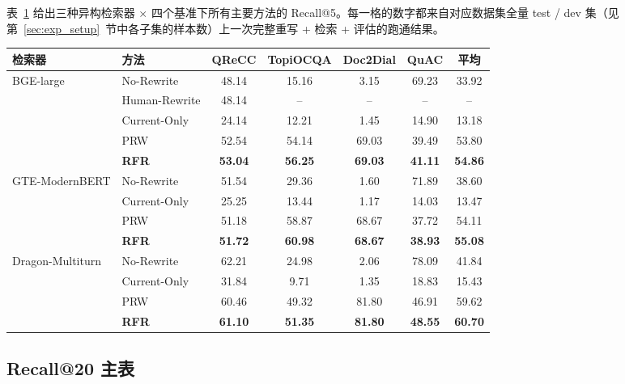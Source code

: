 表~\ref{tab:main_r5} 给出三种异构检索器 $\times$ 四个基准下所有主要方法的 Recall@5。每一格的数字都来自对应数据集全量 test / dev 集（见第~\ref{sec:exp_setup}~节中各子集的样本数）上一次完整重写 + 检索 + 评估的跑通结果。

\begin{table}[h]
\centering
{}
\label{tab:main_r5}
\small
\begin{tabular}{llccccc}
\toprule
检索器 & 方法 & QReCC & TopiOCQA & Doc2Dial & QuAC & 平均 \\
\midrule
\multirow{5}{*}{BGE-large}
 & No-Rewrite     & 48.14 & 15.16 & 3.15 & 69.23 & 33.92 \\
 & Human-Rewrite  & 48.14 & -- & -- & -- & -- \\
 & Current-Only   & 24.14 & 12.21 & 1.45 & 14.90 & 13.18 \\
 & PRW            & 52.54 & 54.14 & 69.03 & 39.49 & 53.80 \\
 & \textbf{RFR}   & \textbf{53.04} & \textbf{56.25} & \textbf{69.03} & \textbf{41.11} & \textbf{54.86} \\
\midrule
\multirow{4}{*}{GTE-ModernBERT}
 & No-Rewrite     & 51.54 & 29.36 & 1.60 & 71.89 & 38.60 \\
 & Current-Only   & 25.25 & 13.44 & 1.17 & 14.03 & 13.47 \\
 & PRW            & 51.18 & 58.87 & 68.67 & 37.72 & 54.11 \\
 & \textbf{RFR}   & \textbf{51.72} & \textbf{60.98} & \textbf{68.67} & \textbf{38.93} & \textbf{55.08} \\
\midrule
\multirow{4}{*}{Dragon-Multiturn}
 & No-Rewrite     & 62.21 & 24.98 & 2.06 & 78.09 & 41.84 \\
 & Current-Only   & 31.84 & 9.71 & 1.35 & 18.83 & 15.43 \\
 & PRW            & 60.46 & 49.32 & 81.80 & 46.91 & 59.62 \\
 & \textbf{RFR}   & \textbf{61.10} & \textbf{51.35} & \textbf{81.80} & \textbf{48.55} & \textbf{60.70} \\
\bottomrule
\end{tabular}
\end{table}

\subsection{Recall@20 主表}

